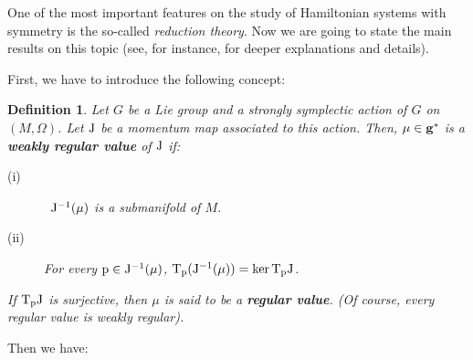 \documentclass[12pt]{report}
\newtheorem{definition}[teor]{Definition}
\def\Tan{{\rm T}}
\begin{document}
One of the most important features on the study of
Hamiltonian systems with symmetry is the so-called
{\sl reduction theory}.
Now we are going to state the main results on this topic
(see, for instance, \cite{CM-2009,MMOPR-2007,MR-99,MW-74,MW,Or-2002,OR-2002,OR-2004,We-77} for deeper explanations and details).

First, we have to introduce the following concept:

\begin{definition}
Let $G$ be a Lie group and a strongly symplectic action
of $G$ on $(M,\Omega)$.
Let ${\rm J}$ be a momentum map associated to this action. Then, 
$\mu \in {\bf g}^*$ is a 
\textbf{weakly regular value} of ${\rm J}$ if:
\begin{description}
\item[{\rm (i)}] \
${\rm J}^{-1}(\mu )$ is a submanifold of $M$.
\item[{\rm (ii)}]
For every ${\rm p}\in {\rm J}^{-1}(\mu )$, 
$\Tan_{\rm p}({\rm J}^{-1}(\mu)) = \ker \Tan_{\rm p}{\rm J}$.
\end{description}
If $\Tan_{\rm p}{\rm J}$ is surjective, then $\mu$ is said to be a \textbf{regular value}. 
(Of course,  every regular value is weakly regular).
\end{definition}

Then we have:
\end{document}
